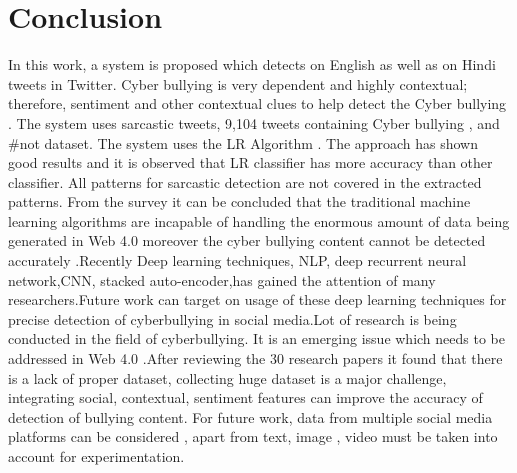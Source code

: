 \documentclass[oneside,a4paper,12pt]{report}
\begin{document}
 \section {Conclusion}
\item In this work, a system is proposed which detects on English as well as on Hindi tweets in Twitter. Cyber bullying is very dependent and highly contextual; therefore, sentiment and other contextual clues to help detect the Cyber bullying . The system uses sarcastic tweets, 9,104 tweets containing Cyber bullying , and #not dataset. The system uses the LR Algorithm . The approach has shown good results and it is observed that LR classifier has more accuracy than other classifier. All patterns for sarcastic detection are not covered in the extracted patterns. 
From the survey it can be
concluded that the traditional machine learning algorithms
are incapable of handling the enormous amount of data
being generated in Web 4.0 moreover the cyber bullying
content cannot be detected accurately .Recently Deep
learning techniques, NLP, deep recurrent neural
network,CNN, stacked auto-encoder,has gained the
attention of many researchers.Future work can target on
usage of these deep learning techniques for precise detection
of cyberbullying in social media.Lot of research is being
conducted in the field of cyberbullying. It is an emerging
issue which needs to be addressed in Web 4.0 .After
reviewing the 30 research papers it found that there is a lack
of proper dataset, collecting huge dataset is a major
challenge, integrating social, contextual, sentiment features
can improve the accuracy of detection of bullying content.
For future work, data from multiple social media platforms
can be considered , apart from text, image , video must be
taken into account for experimentation.
\\
\end{document}
